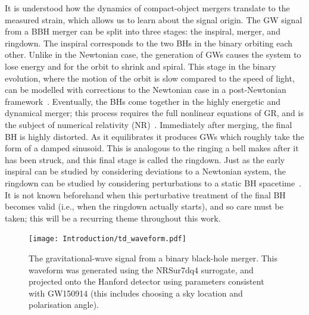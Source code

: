 
It is understood how the dynamics of compact-object mergers translate to the measured strain, which allows us to learn about the signal origin.
The GW signal from a BBH merger can be split into three stages: the inspiral, merger, and ringdown.
The inspiral corresponds to the two BHs in the binary orbiting each other. 
Unlike in the Newtonian case, the generation of GWs causes the system to lose energy and for the orbit to shrink and spiral. 
This stage in the binary evolution, where the motion of the orbit is slow compared to the speed of light, can be modelled with corrections to the Newtonian case in a post-Newtonian framework~\cite{Blanchet:2013haa}. 
Eventually, the BHs come together in the highly energetic and dynamical merger; this process requires the full nonlinear equations of GR, and is the subject of numerical relativity (NR)~\cite{Duez:2018jaf}. 
Immediately after merging, the final BH is highly distorted. 
As it equilibrates it produces GWs which roughly take the form of a damped sinusoid. 
This is analogous to the ringing a bell makes after it has been struck, and this final stage is called the ringdown.
Just as the early inspiral can be studied by considering deviations to a Newtonian system, the ringdown can be studied by considering perturbations to a static BH spacetime~\cite{Sasaki:2003xr, Pound:2021qin}. 
It is not known beforehand when this perturbative treatment of the final BH becomes valid (i.e., when the ringdown actually starts), and so care must be taken; this will be a recurring theme throughout this work.

\begin{figure}[t]
    \centering
    \texttt{[image: Introduction/td\_waveform.pdf]}
    \caption[The time-domain gravitational-wave signal from a binary black-hole merger]{ 
    The gravitational-wave signal from a binary black-hole merger. 
    This waveform was generated using the NRSur7dq4 surrogate, and projected onto the Hanford detector using parameters consistent with GW150914 (this includes choosing a sky location and polarisation angle).
    }
    \label{ch1:fig:td_waveform}
\end{figure}

